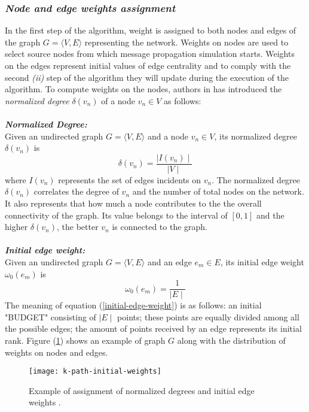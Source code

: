 \subsubsection*{\textit{Node and edge weights assignment}}
In the first step of the algorithm, weight is assigned to both nodes and edges of the graph $G = \langle V, E \rangle$ representing the network. Weights on nodes are used to select source nodes from which message propagation simulation starts. Weights on the edges represent initial values of edge centrality and to comply with the second \textit{(ii)} step of the algorithm they will update during the execution of the algorithm. To compute weights on the nodes, authors in  \cite{ref-35} has introduced the \textit{normalized degree} $\delta(v_n)$ of a node $v_n \in V$ as follows:\\\\
\textbf{\textit{Normalized Degree:}}\\
Given an undirected graph $G = \langle V, E \rangle$ and a node $v_n \in V$, its normalized degree $\delta(v_n)$ is
\begin{equation}\label{k-path-normalized-degree}
\delta (v_n) = \dfrac{\mid I(v_n) \mid}{\mid V \mid}
\end{equation}
where $I(v_n)$ represents the set of edges incidents on $v_n$. The normalized degree $\delta(v_n)$ correlates the degree of $v_n$ and the number of total nodes on the network. It also represents that how much a node contributes to the the overall connectivity of the graph. Its value belongs to the interval of $\left[0,1\right]$ and the higher $\delta (v_n)$, the better $v_n$ is connected to the graph.\\\\
\textbf{\textit{Initial edge weight:}}\\
Given an undirected graph $G = \langle V, E \rangle$ and an edge $e_m \in E$, its initial edge weight $\omega_0 (e_m)$ is
\begin{equation}\label{initial-edge-weight}
\omega_0(e_m) = \dfrac{1}{\mid E \mid}
\end{equation}
The meaning of equation (\ref{initial-edge-weight}) is as follows: an initial "BUDGET" consisting of $\mid E \mid$ points; these points are equally divided among all the possible edges; the amount of points received by an edge represents its initial rank. Figure (\ref{fig:initial-edge-weight-graph}) shows an example of graph $G$ along with the distribution of weights on nodes and edges.
\begin{figure}[!ht]
	\centering
	\texttt{[image: k-path-initial-weights]}
	\caption{Example of assignment of normalized degrees and initial edge weights \cite{ref-35}.}
	\label{fig:initial-edge-weight-graph}
\end{figure}

